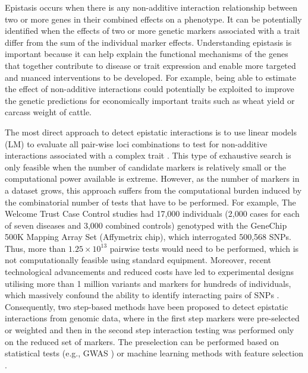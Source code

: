 \documentclass[preprint,12pt,3p]{elsarticle}
\begin{document}
Epistasis occurs when there is any non-additive interaction relationship between two or more genes in their combined
effects on a phenotype. It can be potentially identified when the effects of two or more genetic markers associated with
a trait differ from the sum of the individual marker effects. Understanding epistasis is important because it can help
explain the functional mechanisms of the genes that together contribute to disease or trait expression and enable more
targeted and nuanced interventions to be developed. For example, being able to estimate the effect of non-additive
interactions could potentially be exploited to improve the genetic predictions \cite[]{Ansarifar.et.al.2020} for
economically important traits such as wheat yield or carcass weight of cattle.

The most direct approach to detect epistatic interactions is to use linear models (LM) to evaluate all pair-wise loci
combinations to test for non-additive interactions associated with a complex trait \cite[]{Zhang.et.al.2008}. This type
of exhaustive search is only feasible when the number of candidate markers is relatively small or the computational
power available is extreme. However, as the number of markers in a dataset grows, this approach suffers from the
computational burden induced by the combinatorial number of tests that have to be performed. For example, The Welcome
Trust Case Control studies \cite[]{burtonGenomewideAssociationStudy2007brief} had 17,000 individuals (2,000 cases for
each of seven diseases and 3,000 combined controls) genotyped with the GeneChip 500K Mapping Array Set (Affymetrix
chip), which interrogated 500,568 SNPs. Thus, more than $1.25\times 10^{13}$ pairwise tests would need to be performed, which is
not computationally feasible using standard equipment. Moreover, recent technological advancements and reduced costs
have led to experimental designs utilising more than 1 million variants and markers for hundreds of individuals,
which massively confound the ability to identify interacting pairs of SNPs \cite[]{Ha.et.al2014,
  Gholami.et.el2014,1000GenomeProject.2015.brief,utah.edu}. Consequently, two step-based methods have been proposed to
detect epistatic interactions from genomic data, where in the first step markers were pre-selected or weighted and then
in the second step interaction testing was performed only on the reduced set of markers. The preselection can be
performed based on statistical tests (e.g., GWAS \cite[]{Pecanka.et.al.2017}) or machine learning methods with feature
selection \cite[]{Jiang.et.al.2009, Meng.et.al.2007}.
\end{document}
